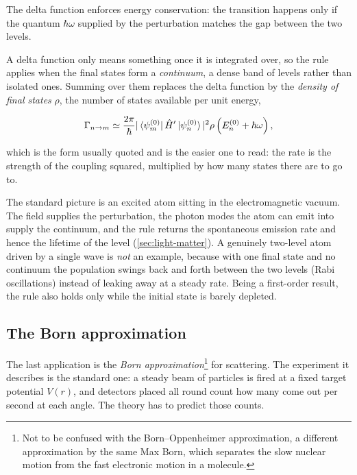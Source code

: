         The delta function enforces energy conservation: the transition happens only if the quantum $\hbar\omega$ supplied by the perturbation matches the gap between the two levels.

        A delta function only means something once it is integrated over, so the rule applies when the final states form a \emph{continuum}, a dense band of levels rather than isolated ones. Summing over them replaces the delta function by the \emph{density of final states} $\rho$, the number of states available per unit energy,

        \begin{equation}\label{eq:fermi-golden-rule-dos}
            \Gamma_{n\rightarrow{}m} \simeq \frac{2\pi}{\hbar} |\bra{\psi_m^{(0)}}\hat{H}'\ket{\psi_n^{(0)}}|^2 \rho\left(E_n^{(0)} + \hbar\omega\right),
        \end{equation}

        which is the form usually quoted and is the easier one to read: the rate is the strength of the coupling squared, multiplied by how many states there are to go to.

        The standard picture is an excited atom sitting in the electromagnetic vacuum. The field supplies the perturbation, the photon modes the atom can emit into supply the continuum, and the rule returns the spontaneous emission rate and hence the lifetime of the level (\cref{sec:light-matter}). A genuinely two-level atom driven by a single wave is \emph{not} an example, because with one final state and no continuum the population swings back and forth between the two levels (Rabi oscillations) instead of leaking away at a steady rate. Being a first-order result, the rule also holds only while the initial state is barely depleted.

    \subsection{The Born approximation}

        The last application is the \emph{Born approximation}\footnote{
            Not to be confused with the Born--Oppenheimer approximation, a different approximation by the same Max Born, which separates the slow nuclear motion from the fast electronic motion in a molecule.
        } for scattering. The experiment it describes is the standard one: a steady beam of particles is fired at a fixed target potential $V(r)$, and detectors placed all round count how many come out per second at each angle. The theory has to predict those counts.

